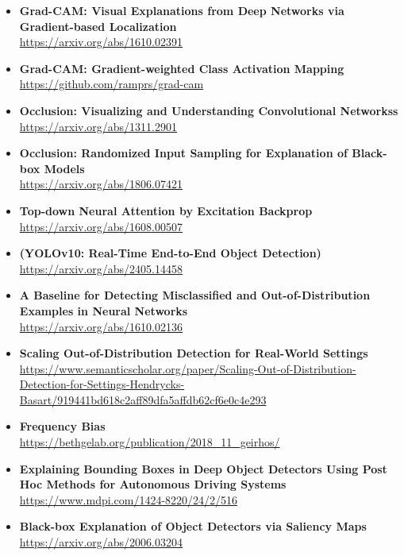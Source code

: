 \begin{itemize}

    \item \textbf{Grad-CAM: Visual Explanations from Deep Networks via Gradient-based Localization} \\
    \url{https://arxiv.org/abs/1610.02391}

    \item \textbf{Grad-CAM: Gradient-weighted Class Activation Mapping} \\
    \url{https://github.com/ramprs/grad-cam}
    
    \item \textbf{Occlusion: Visualizing and Understanding Convolutional Networkss} \\
    \url{https://arxiv.org/abs/1311.2901}
    
    \item \textbf{Occlusion: Randomized Input Sampling for Explanation of Black-box Models} \\
    \url{https://arxiv.org/abs/1806.07421}
    
    \item \textbf{Top-down Neural Attention by Excitation Backprop} \\
    \url{https://arxiv.org/abs/1608.00507}
    
    \item \textbf{(YOLOv10: Real-Time End-to-End Object Detection)} \\
    \url{https://arxiv.org/abs/2405.14458}
    
    \item \textbf{A Baseline for Detecting Misclassified and Out-of-Distribution Examples in Neural Networks} \\
    \url{https://arxiv.org/abs/1610.02136}

    \item \textbf{Scaling Out-of-Distribution Detection for Real-World Settings} \\
    \url{https://www.semanticscholar.org/paper/Scaling-Out-of-Distribution-Detection-for-Settings-Hendrycks-Basart/919441bd618c2aff89dfa5affdb62cf6e0c4e293}

    \item \textbf{Frequency Bias} \\
    \url{https://bethgelab.org/publication/2018_11_geirhos/}

    \item \textbf{Explaining Bounding Boxes in Deep Object Detectors Using Post Hoc Methods for Autonomous Driving Systems} \\
    \url{https://www.mdpi.com/1424-8220/24/2/516}

    \item \textbf{Black-box Explanation of Object Detectors via Saliency Maps} \\
    \url{https://arxiv.org/abs/2006.03204}
    
    \end{itemize}